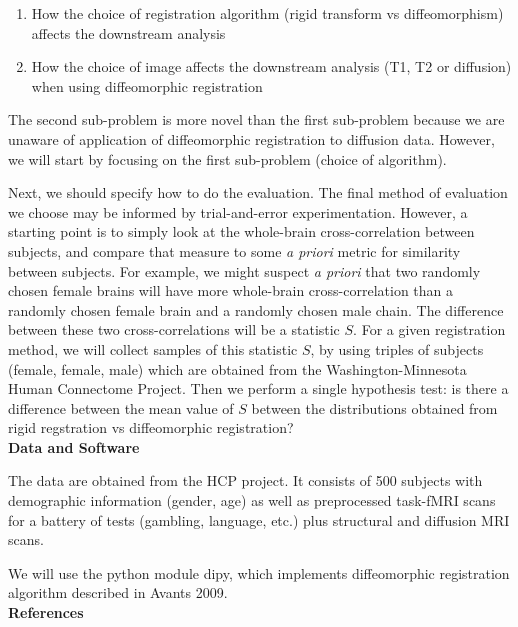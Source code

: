 \documentclass[11pt]{article}
\begin{document}
\begin{enumerate}
\item How the choice of registration algorithm (rigid transform vs diffeomorphism) affects the downstream analysis
\item How the choice of image affects the downstream analysis (T1, T2 or diffusion) when using diffeomorphic registration
\end{enumerate}

The second sub-problem is more novel than the first sub-problem because we are unaware of application of diffeomorphic registration to diffusion data.
However, we will start by focusing on the first sub-problem (choice of algorithm).

Next, we should specify how to do the evaluation.
The final method of evaluation we choose may be informed by trial-and-error experimentation.
However, a starting point is to simply look at the whole-brain cross-correlation between subjects, and compare that measure to some \emph{a priori} metric for similarity between subjects.
For example, we might suspect \emph{a priori} that two randomly chosen female brains will have more whole-brain cross-correlation than a randomly chosen female brain and a randomly chosen male chain.
The difference between these two cross-correlations will be a statistic $S$.
For a given registration method, we will collect samples of this statistic $S$, by using triples of subjects (female, female, male) which are obtained from the Washington-Minnesota Human Connectome Project.
Then we perform a single hypothesis test: is there a difference between the mean value of $S$ between the distributions obtained from rigid regstration vs diffeomorphic registration?
\\

\noindent\textbf{Data and Software}

The data are obtained from the HCP project.
It consists of 500 subjects with demographic information (gender, age) as well as preprocessed task-fMRI scans for a battery of tests (gambling, language, etc.) plus structural and diffusion MRI scans.

We will use the python module dipy, which implements diffeomorphic registration algorithm described in Avants 2009.
\\

\noindent\textbf{References}
\end{document}
